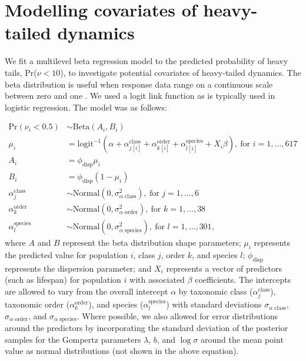 \section{Modelling covariates of heavy-tailed dynamics}

We fit a multilevel beta regression model to the predicted probability of heavy tails, Pr($\nu < 10$), to investigate potential covariates of heavy-tailed dynamics. The beta distribution is useful when response data range on a continuous scale between zero and one \citep{ferrari2004}. We used a logit link function as is typically used in logistic regression. The model was as follows:

\begin{align*}
\mathrm{Pr}(\nu_i < 0.5) &\sim \mathrm{Beta}(A_i, B_i)\\
\mu_i &= \mathrm{logit}^{-1}(\alpha
  + \alpha^\mathrm{class}_{j[i]}
  + \alpha^\mathrm{order}_{k[i]}
  + \alpha^\mathrm{species}_{l[i]}
  + X_i \beta),
  \: \text{for } i = 1, \dots, 617\\
A_i &= \phi_\mathrm{disp} \mu_i\\
B_i &= \phi_\mathrm{disp} (1 - \mu_i)\\
\alpha^\mathrm{class}_j &\sim
  \mathrm{Normal}(0, \sigma^2_{\alpha \; \mathrm{class}}),
  \: \text{for } j = 1, \dots, 6\\
\alpha^\mathrm{order}_k &\sim
  \mathrm{Normal}(0, \sigma^2_{\alpha \; \mathrm{order}}),
  \: \text{for } k = 1, \dots, 38\\
\alpha^\mathrm{species}_l &\sim
  \mathrm{Normal}(0, \sigma^2_{\alpha \; \mathrm{species}}),
  \: \text{for } l = 1, \dots, 301,
\end{align*}
where $A$ and $B$ represent the beta distribution shape parameters; $\mu_i$ represents the predicted value for population $i$, class $j$, order $k$, and species $l$; $\phi_\mathrm{disp}$ represents the dispersion parameter; and $X_i$ represents a vector of predictors (such as lifespan) for population $i$ with associated $\beta$ coefficients. The intercepts are allowed to vary from the overall intercept $\alpha$ by taxonomic class ($\alpha^\mathrm{class}_j$), taxonomic order ($\alpha^\mathrm{order}_k$), and species ($\alpha^\mathrm{species}_l$) with standard deviations $\sigma_{\alpha \; \mathrm{class}}$, $\sigma_{\alpha \; \mathrm{order}}$, and $\sigma_{\alpha \; \mathrm{species}}$. Where possible, we also allowed for error distributions around the predictors by incorporating the standard deviation of the posterior samples for the Gompertz parameters $\lambda$, $b$, and $\log \sigma$ around the mean point value as normal distributions (not shown in the above equation).

